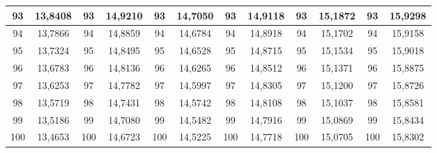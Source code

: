 \documentclass[a4paper,12pt]{article} %
\begin{document}
\begin{longtable}[c]{cccccccccc|c|c|}
	\multicolumn{1}{|c|}{93} & \multicolumn{1}{c|}{13,8408} & \multicolumn{1}{c|}{93} & \multicolumn{1}{c|}{14,9210} & \multicolumn{1}{c|}{93} & \multicolumn{1}{c|}{14,7050} & \multicolumn{1}{c|}{93} & \multicolumn{1}{c|}{14,9118} & \multicolumn{1}{c|}{93} & 15,1872 & 93 & 15,9298 \\ \hline
	\multicolumn{1}{|c|}{94} & \multicolumn{1}{c|}{13,7866} & \multicolumn{1}{c|}{94} & \multicolumn{1}{c|}{14,8859} & \multicolumn{1}{c|}{94} & \multicolumn{1}{c|}{14,6784} & \multicolumn{1}{c|}{94} & \multicolumn{1}{c|}{14,8918} & \multicolumn{1}{c|}{94} & 15,1702 & 94 & 15,9158 \\ \hline
	\multicolumn{1}{|c|}{95} & \multicolumn{1}{c|}{13,7324} & \multicolumn{1}{c|}{95} & \multicolumn{1}{c|}{14,8495} & \multicolumn{1}{c|}{95} & \multicolumn{1}{c|}{14,6528} & \multicolumn{1}{c|}{95} & \multicolumn{1}{c|}{14,8715} & \multicolumn{1}{c|}{95} & 15,1534 & 95 & 15,9018 \\ \hline
	\multicolumn{1}{|c|}{96} & \multicolumn{1}{c|}{13,6783} & \multicolumn{1}{c|}{96} & \multicolumn{1}{c|}{14,8136} & \multicolumn{1}{c|}{96} & \multicolumn{1}{c|}{14,6265} & \multicolumn{1}{c|}{96} & \multicolumn{1}{c|}{14,8512} & \multicolumn{1}{c|}{96} & 15,1371 & 96 & 15,8875 \\ \hline
	\multicolumn{1}{|c|}{97} & \multicolumn{1}{c|}{13,6253} & \multicolumn{1}{c|}{97} & \multicolumn{1}{c|}{14,7782} & \multicolumn{1}{c|}{97} & \multicolumn{1}{c|}{14,5997} & \multicolumn{1}{c|}{97} & \multicolumn{1}{c|}{14,8305} & \multicolumn{1}{c|}{97} & 15,1200 & 97 & 15,8726 \\ \hline
	\multicolumn{1}{|c|}{98} & \multicolumn{1}{c|}{13,5719} & \multicolumn{1}{c|}{98} & \multicolumn{1}{c|}{14,7431} & \multicolumn{1}{c|}{98} & \multicolumn{1}{c|}{14,5742} & \multicolumn{1}{c|}{98} & \multicolumn{1}{c|}{14,8108} & \multicolumn{1}{c|}{98} & 15,1037 & 98 & 15,8581 \\ \hline
	\multicolumn{1}{|c|}{99} & \multicolumn{1}{c|}{13,5186} & \multicolumn{1}{c|}{99} & \multicolumn{1}{c|}{14,7080} & \multicolumn{1}{c|}{99} & \multicolumn{1}{c|}{14,5482} & \multicolumn{1}{c|}{99} & \multicolumn{1}{c|}{14,7916} & \multicolumn{1}{c|}{99} & 15,0869 & 99 & 15,8434 \\ \hline
	\multicolumn{1}{|c|}{100} & \multicolumn{1}{c|}{13,4653} & \multicolumn{1}{c|}{100} & \multicolumn{1}{c|}{14,6723} & \multicolumn{1}{c|}{100} & \multicolumn{1}{c|}{14,5225} & \multicolumn{1}{c|}{100} & \multicolumn{1}{c|}{14,7718} & \multicolumn{1}{c|}{100} & 15,0705 & 100 & 15,8302 \\ \hline

\end{longtable}
\end{document}
